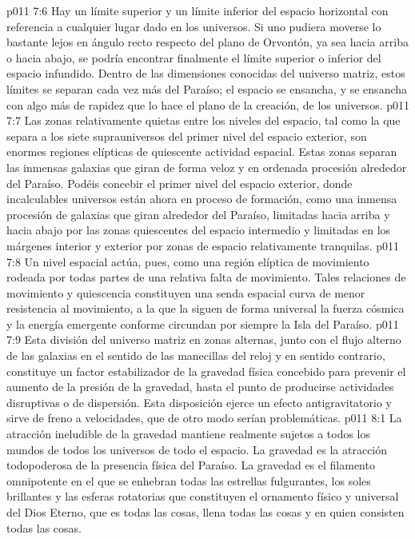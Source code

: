 \vs p011 7:6 Hay un límite superior y un límite inferior del espacio horizontal con referencia a cualquier lugar dado en los universos. Si uno pudiera moverse lo bastante lejos en ángulo recto respecto del plano de Orvontón, ya sea hacia arriba o hacia abajo, se podría encontrar finalmente el límite superior o inferior del espacio infundido. Dentro de las dimensiones conocidas del universo matriz, estos límites se separan cada vez más del Paraíso; el espacio se ensancha, y se ensancha con algo más de rapidez que lo hace el plano de la creación, de los universos.
\vs p011 7:7 \pc Las zonas relativamente quietas entre los niveles del espacio, tal como la que separa a los siete suprauniversos del primer nivel del espacio exterior, son enormes regiones elípticas de quiescente actividad espacial. Estas zonas separan las inmensas galaxias que giran de forma veloz y en ordenada procesión alrededor del Paraíso. Podéis concebir el primer nivel del espacio exterior, donde incalculables universos están ahora en proceso de formación, como una inmensa procesión de galaxias que giran alrededor del Paraíso, limitadas hacia arriba y hacia abajo por las zonas quiescentes del espacio intermedio y limitadas en los márgenes interior y exterior por zonas de espacio relativamente tranquilas.
\vs p011 7:8 Un nivel espacial actúa, pues, como una región elíptica de movimiento rodeada por todas partes de una relativa falta de movimiento. Tales relaciones de movimiento y quiescencia constituyen una senda espacial curva de menor resistencia al movimiento, a la que la siguen de forma universal la fuerza cósmica y la energía emergente conforme circundan por siempre la Isla del Paraíso.
\vs p011 7:9 Esta división del universo matriz en zonas alternas, junto con el flujo alterno de las galaxias en el sentido de las manecillas del reloj y en sentido contrario, constituye un factor estabilizador de la gravedad física concebido para prevenir el aumento de la presión de la gravedad, hasta el punto de producirse actividades disruptivas o de dispersión. Esta disposición ejerce un efecto antigravitatorio y sirve de freno a velocidades, que de otro modo serían problemáticas.
\vs p011 8:1 La atracción ineludible de la gravedad mantiene realmente sujetos a todos los mundos de todos los universos de todo el espacio. La gravedad es la atracción todopoderosa de la presencia física del Paraíso. La gravedad es el filamento omnipotente en el que se enhebran todas las estrellas fulgurantes, los soles brillantes y las esferas rotatorias que constituyen el ornamento físico y universal del Dios Eterno, que es todas las cosas, llena todas las cosas y en quien consisten todas las cosas.
